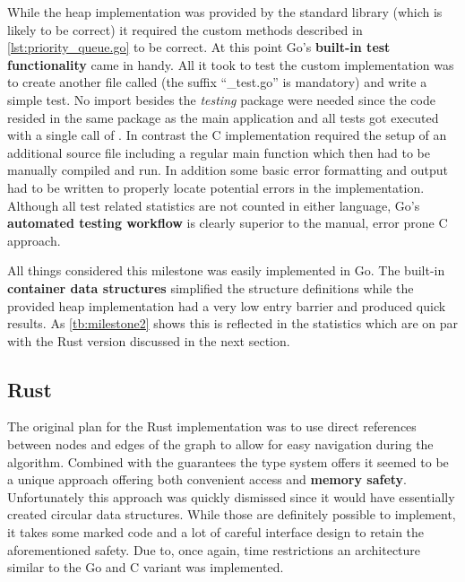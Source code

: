 While the heap implementation was provided by the standard library (which is likely to be correct) it required the custom methods described in \autoref{lst:priority_queue.go} to be correct. At this point Go's \textbf{built-in test functionality} came in handy. All it took to test the custom implementation was to create another file called  (the suffix ``\_test.go'' is mandatory) and write a simple test. No import besides the \textit{testing} package were needed since the code resided in the same package as the main application and all tests got executed with a single call of . In contrast the C implementation required the setup of an additional source file including a regular main function which then had to be manually compiled and run. In addition some basic error formatting and output had to be written to properly locate potential errors in the implementation. Although all test related statistics are not counted in either language, Go's \textbf{automated testing workflow} is clearly superior to the manual, error prone C approach.

All things considered this milestone was easily implemented in Go. The built-in \textbf{container data structures} simplified the structure definitions while the provided heap implementation had a very low entry barrier and produced quick results. As \autoref{tb:milestone2} shows this is reflected in the statistics which are on par with the Rust version discussed in the next section.

\subsection{Rust}
\label{subsec:Implementation::Graph_Representation::Rust}

The original plan for the Rust implementation was to use direct references between nodes and edges of the graph to allow for easy navigation during the algorithm. Combined with the guarantees the type system offers it seemed to be a unique approach offering both convenient access and \textbf{memory safety}. Unfortunately this approach was quickly dismissed since it would have essentially created circular data structures. While those are definitely possible to implement, it takes some  marked code and a lot of careful interface design to retain the aforementioned safety. Due to, once again, time restrictions an architecture similar to the Go and C variant was implemented.

